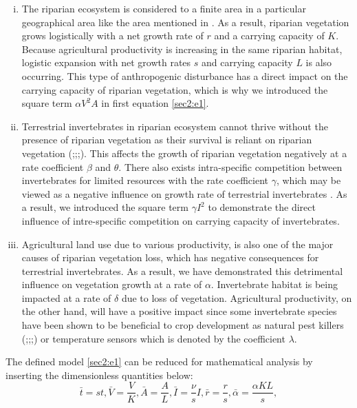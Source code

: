 \documentclass[12pt]{article}
\numberwithin{equation}{section}
\begin{document}
\begin{enumerate}[i).]
\item The riparian ecosystem is considered to a finite area in a particular geographical area like the area mentioned in \cite{popescu2021riparian}. As a result, riparian vegetation grows logistically with a net growth rate of $r$ and a carrying capacity of $K$. Because agricultural productivity is increasing in the same riparian habitat, logistic expansion with net growth rates $s$ and carrying capacity $L$ is also occurring. This type of anthropogenic disturbance has a direct impact on the carrying capacity of riparian vegetation, which is why we introduced the square term $\alpha V^2A$ in first equation \eqref{sec2:e1}.
\item Terrestrial invertebrates in riparian ecosystem cannot thrive without the presence of riparian vegetation as their survival is reliant on riparian vegetation (\cite{popescu2021riparian};\cite{edwards1996effect};\cite{ramey2017terrestrial};\cite{forio2020small}). This affects the growth of riparian vegetation negatively at a rate coefficient $\beta$ and $\theta$. There also exists intra-specific competition between invertebrates for limited resources with the rate coefficient $\gamma$, which may be viewed as a negative influence on growth rate of terrestrial invertebrates \cite{ruetz2003interspecific}. As a result, we introduced the square term $\gamma I^2$ to demonstrate the direct influence of intre-specific competition on carrying capacity of invertebrates.
\item Agricultural land use due to various productivity, is also one of the major causes of riparian vegetation loss, which has negative consequences for terrestrial invertebrates. As a result, we have demonstrated this detrimental influence on vegetation growth at a rate of $\alpha$. Invertebrate habitat is being impacted at a rate of $\delta$ due to loss of vegetation. Agricultural productivity, on the other hand, will have a positive impact since some invertebrate species have been shown to be beneficial to crop development as natural pest killers (\cite{krell2015aquatic};\cite{riis2020global};\cite{stockan2014effects};\cite{cole2012riparian}) or temperature sensors \cite{greenwood1995patial} which is denoted by the coefficient $\lambda$.
\end{enumerate}
The defined model \eqref{sec2:e1} can be reduced for mathematical analysis by inserting the dimensionless quantities below:\\
\begin{equation*}
\bar t=st, \bar V=\frac{V}{K}, \bar A=\frac{A}{L}, \bar I=\frac{\nu}{s}I, \bar r=\frac{r}{s}, \bar \alpha=\frac{\alpha KL}{s},
\end{equation*}
\end{document}
